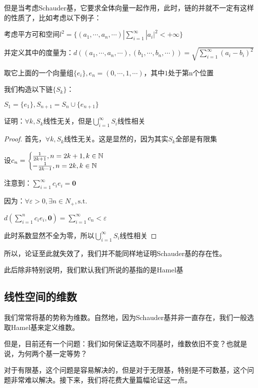 \documentclass[12pt, a4paper, oneside, UTF8]{ctexbook}
\begin{document}
			但是当考虑Schauder基，它要求全体向量一起作用，此时，链的并就不一定有这样的性质了，比如考虑以下例子：
			\begin{example}
				考虑平方可和空间$l^2 = \{(a_1,\cdots,a_n,\cdots)| \sum\limits_{i=1}^{\infty} |a_i|^2 < + \infty\}$

				并定义其中的度量为：$d\left((a_1,\cdots,a_n,\cdots),(b_1,\cdots,b_n,\cdots)\right)=\sqrt{\sum\limits_{i=1}^{\infty} (a_i-b_i)^2}$
				
				取它上面的一个向量组$\{e_i\},e_n = (0,\cdots,1,\cdots)$，其中$1$处于第n个位置

				我们构造以下链$\{S_k\}$：

				$S_1 = \{e_1\},S_{n+1}=S_n \cup \{e_{n+1}\}$

				证明：$\forall k,S_k$线性无关，但是$\bigcup_{i=1}^{\infty} S_i$线性相关
			\end{example}
			\begin{proof}
				首先，$\forall k,S_k$线性无关。这是显然的，因为其实$S_k$全部是有限集

				设$c_n = \begin{cases}
					\frac{1}{2k+1},n=2k+1,k \in \mathbb{N} \\
					-\frac{1}{2k-1},n=2k,k\in \mathbb{N} \\
				\end{cases}$

				注意到：$\sum\limits_{i=1}^{\infty} c_i e_i = \mathbf{0}$

				因为：$\forall \varepsilon >0,\exists n \in N_+,\text{s.t.}$
				
				$d\left(\sum\limits_{i=1}^{n} c_i e_i,\mathbf{0}\right)=\sum\limits_{i=1}^{\infty} c_n < \varepsilon $

				此时系数显然不全为零，所以$\bigcup_{i=1}^{\infty} S_i$线性相关
			\end{proof}
			所以，论证至此就失效了，我们并不能同样地证明Schauder基的存在性。

			此后除非特别说明，我们默认我们所说的基指的是Hamel基
		\subsection{线性空间的维数}
			我们常常将基的势称为维数。自然地，因为Schauder基并非一直存在，我们一般选取Hamel基来定义维数。

			但是，目前还有一个问题：我们如何保证选取不同基时，维数依旧不变？也就是说，为何两个基一定等势？

			对于有限基，这个问题是容易解决的，但是对于无限基，特别是不可数基，这个问题非常难以解决。接下来，我们将花费大量篇幅论证这一点。
\end{document}

